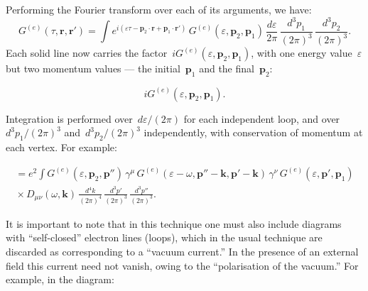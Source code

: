 Performing the Fourier transform over each of its arguments, we have:
\begin{equation}
G^{(e)}(\tau, \mathbf{r}, \mathbf{r}') = \int\! e^{i(\varepsilon\tau - \mathbf{p}_2\cdot\mathbf{r} + \mathbf{p}_1\cdot\mathbf{r}')}\,G^{(e)}(\varepsilon, \mathbf{p}_2, \mathbf{p}_1)\,\frac{d\varepsilon}{2\pi}\,\frac{d^3p_1}{(2\pi)^3}\,\frac{d^3p_2}{(2\pi)^3}.
\label{eq:109.7}
\end{equation}
Each solid line now carries the factor~$iG^{(e)}(\varepsilon, \mathbf{p}_2, \mathbf{p}_1)$, with one energy value~$\varepsilon$ but two momentum values --- the initial~$\mathbf{p}_1$ and the final~$\mathbf{p}_2$:

\begin{equation}
iG^{(e)}(\varepsilon, \mathbf{p}_2, \mathbf{p}_1).
\label{eq:109.8}
\end{equation}

Integration is performed over~$d\varepsilon/(2\pi)$ for each independent loop, and over~$d^3p_1/(2\pi)^3$ and~$d^3p_2/(2\pi)^3$ independently, with conservation of momentum at each vertex. For example:

\begin{multline}
= e^2\!\int G^{(e)}(\varepsilon, \mathbf{p}_2, \mathbf{p}'')\,\gamma^\mu\,G^{(e)}(\varepsilon - \omega, \mathbf{p}'' - \mathbf{k}, \mathbf{p}' - \mathbf{k})\,\gamma^\nu\,G^{(e)}(\varepsilon, \mathbf{p}', \mathbf{p}_1) \\
{}\times D_{\mu\nu}(\omega, \mathbf{k})\,\frac{d^4k}{(2\pi)^4}\,\frac{d^3p'}{(2\pi)^3}\,\frac{d^3p''}{(2\pi)^3}.
\label{eq:109.9}
\end{multline}

It is important to note that in this technique one must also include diagrams with ``self-closed'' electron lines (loops), which in the usual technique are discarded as corresponding to a ``vacuum current.'' In the presence of an external field this current need not vanish, owing to the ``polarisation of the vacuum.'' For example, in the diagram:

\begin{equation}
\label{eq:109.10}
\end{equation}

